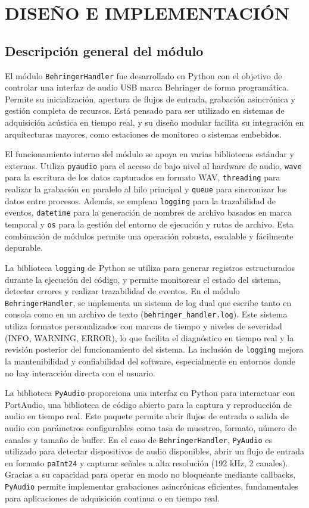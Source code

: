 \clearpage
\section{DISEÑO E IMPLEMENTACIÓN }

\subsection{Descripción general del módulo}

El módulo \texttt{BehringerHandler} fue desarrollado en Python con el objetivo de controlar una interfaz de audio USB marca Behringer de forma programática. Permite su inicialización, apertura de flujos de entrada, grabación asincrónica y gestión completa de recursos. Está pensado para ser utilizado en sistemas de adquisición acústica en tiempo real, y su diseño modular facilita su integración en arquitecturas mayores, como estaciones de monitoreo o sistemas embebidos.

El funcionamiento interno del módulo se apoya en varias bibliotecas estándar y externas. Utiliza \texttt{pyaudio} para el acceso de bajo nivel al hardware de audio, \texttt{wave} para la escritura de los datos capturados en formato WAV, \texttt{threading} para realizar la grabación en paralelo al hilo principal y \texttt{queue} para sincronizar los datos entre procesos. Además, se emplean \texttt{logging} para la trazabilidad de eventos, \texttt{datetime} para la generación de nombres de archivo basados en marca temporal y \texttt{os} para la gestión del entorno de ejecución y rutas de archivo. Esta combinación de módulos permite una operación robusta, escalable y fácilmente depurable.

La biblioteca \texttt{logging} de Python se utiliza para generar registros estructurados durante la ejecución del código, y permite monitorear el estado del sistema, detectar errores y realizar trazabilidad de eventos. En el módulo \texttt{BehringerHandler}, se implementa un sistema de log dual que escribe tanto en consola como en un archivo de texto (\texttt{behringer\_handler.log}). Este sistema utiliza formatos personalizados con marcas de tiempo y niveles de severidad (INFO, WARNING, ERROR), lo que facilita el diagnóstico en tiempo real y la revisión posterior del funcionamiento del sistema. La inclusión de \texttt{logging} mejora la mantenibilidad y confiabilidad del software, especialmente en entornos donde no hay interacción directa con el usuario.

La biblioteca \texttt{PyAudio} proporciona una interfaz en Python para interactuar con PortAudio, una biblioteca de código abierto para la captura y reproducción de audio en tiempo real. Este paquete permite abrir flujos de entrada o salida de audio con parámetros configurables como tasa de muestreo, formato, número de canales y tamaño de buffer. En el caso de \texttt{BehringerHandler}, \texttt{PyAudio} es utilizado para detectar dispositivos de audio disponibles, abrir un flujo de entrada en formato \texttt{paInt24} y capturar señales a alta resolución (192 kHz, 2 canales). Gracias a su capacidad para operar en modo no bloqueante mediante callbacks, \texttt{PyAudio} permite implementar grabaciones asincrónicas eficientes, fundamentales para aplicaciones de adquisición continua o en tiempo real.

